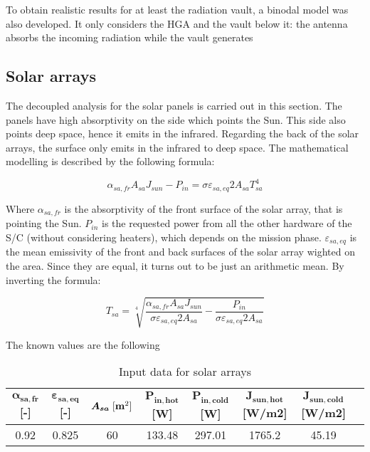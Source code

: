 To obtain realistic results for at least the radiation vault, a binodal model was also developed. It only considers the HGA and the vault below it: the antenna absorbs the incoming radiation while the vault generates 


\subsection{Solar arrays}
\label{subsec:solar_arrays_sizing}

The decoupled analysis for the solar panels is carried out in this section. The panels have high absorptivity on the side which points the Sun. This side also points deep space, hence it emits in the infrared. Regarding the back of the solar arrays, the surface only emits in the infrared to deep space.
The mathematical modelling is described by the following formula:

\begin{equation}
    \alpha_{sa,fr}A_{sa} J_{sun} - P_{in} = \sigma \varepsilon_{sa,eq}2 A_{sa}T_{sa}^4
\end{equation}

Where $\alpha_{sa,fr}$ is the absorptivity of the front surface of the solar array, that is pointing the Sun. $P_{in}$ is the requested power from all the other hardware of the S/C (without considering heaters), which depends on the mission phase. $\varepsilon_{sa,eq}$ is the mean emissivity of the front and back surfaces of the solar array wighted on the area. Since they are equal, it turns out to be just an arithmetic
mean. By inverting the formula:

\begin{equation}
    T_{sa} = \sqrt [4] {\frac{\alpha_{sa,fr}A_{sa} J_{sun}}{\sigma  \varepsilon_{sa,eq}2 A_{sa}} - \frac{P_{in}}{\sigma  \varepsilon_{sa,eq}2 A_{sa}}}
\end{equation}

The known values are the following

\begin{table}[H]
    \renewcommand{\arraystretch}{1.3}
    \centering
    \begin{tabular}{|c|c|c|c|c|c|c|c|}
        \hline
        $\boldsymbol{\alpha_{sa,fr}}$ [-] & $\boldsymbol{\varepsilon_{sa,eq}}$ [-] & $\boldsymbol{A_{sa}}\;[\textrm{\textbf{m}}^2]$ & $\boldsymbol{P_{in,hot}}$ [W] & $\boldsymbol{P_{in,cold}}$ [W] & $\boldsymbol{J_{sun,hot}}$ [W/m2] & $\boldsymbol{J_{sun,cold}}$ [W/m2]\\
        \hline
        0.92 & 0.825 & 60 &  133.48 & 297.01 & 1765.2 & 45.19 \\
        \hline
    \end{tabular}
    \caption{Input data for solar arrays}
    \label{table:sa_data}
\end{table}


